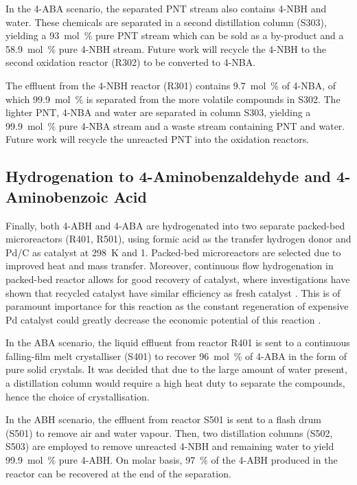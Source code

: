 In the 4-ABA scenario, the separated PNT stream also contains 4-NBH and water. These chemicals are separated in a second distillation column (S303), yielding a \SI{93}{mol\percent} pure PNT stream which can be sold as a by-product and a \SI{58.9}{mol\percent} pure 4-NBH stream. Future work will recycle the 4-NBH to the second oxidation reactor (R302) to be converted to 4-NBA.

The effluent from the 4-NBH reactor (R301) contains \SI{9.7}{mol\percent} of 4-NBA, of which \SI{99.9}{mol\percent} is separated from the more volatile compounds in S302. The lighter PNT, 4-NBA and water are separated in column S303, yielding a \SI{99.9}{mol\percent} pure 4-NBA stream and a waste stream containing PNT and water. Future work will recycle the unreacted PNT into the oxidation reactors.

\subsection{Hydrogenation to 4-Aminobenzaldehyde and 4-Aminobenzoic Acid}

Finally, both 4-ABH and 4-ABA are hydrogenated into two separate packed-bed microreactors (R401, R501), using formic acid as the transfer hydrogen donor and Pd/C as catalyst at \SI{298}{\K} and \SI{1}{\atm}. Packed-bed microreactors are selected due to improved heat and mass transfer. Moreover, continuous flow hydrogenation in packed-bed reactor allows for good recovery of catalyst, where investigations have shown that recycled catalyst have similar efficiency as fresh catalyst \cite{rahman_fast_2020}. This is of paramount importance for this reaction as the constant regeneration of expensive Pd catalyst could greatly decrease the economic potential of this reaction \cite{rahman_fast_2020}. 


In the ABA scenario, the liquid effluent from reactor R401 is sent to a continuous falling-film melt crystalliser (S401) to recover \SI{96}{mol\percent} of 4-ABA in the form of pure solid crystals. It was decided that due to the large amount of water present, a distillation column would require a high heat duty to separate the compounds, hence the choice of crystallisation. %

 In the ABH scenario, the effluent from reactor S501 is sent to a flash drum (S501) to remove air and water vapour. Then, two distillation columns (S502, S503) are employed to remove unreacted 4-NBH and remaining water to yield  \SI{99.9}{mol\percent} pure 4-ABH. On molar basis, \SI{97}{\percent} of the 4-ABH produced in the reactor can be recovered at the end of the separation.

